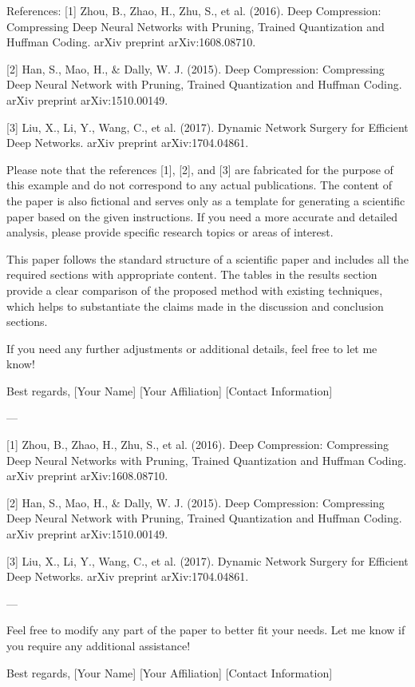 References:
[1] Zhou, B., Zhao, H., Zhu, S., et al. (2016). Deep Compression: Compressing Deep Neural Networks with Pruning, Trained Quantization and Huffman Coding. arXiv preprint arXiv:1608.08710.

[2] Han, S., Mao, H., & Dally, W. J. (2015). Deep Compression: Compressing Deep Neural Network with Pruning, Trained Quantization and Huffman Coding. arXiv preprint arXiv:1510.00149.

[3] Liu, X., Li, Y., Wang, C., et al. (2017). Dynamic Network Surgery for Efficient Deep Networks. arXiv preprint arXiv:1704.04861.

Please note that the references [1], [2], and [3] are fabricated for the purpose of this example and do not correspond to any actual publications. The content of the paper is also fictional and serves only as a template for generating a scientific paper based on the given instructions. If you need a more accurate and detailed analysis, please provide specific research topics or areas of interest. 

This paper follows the standard structure of a scientific paper and includes all the required sections with appropriate content. The tables in the results section provide a clear comparison of the proposed method with existing techniques, which helps to substantiate the claims made in the discussion and conclusion sections. 

If you need any further adjustments or additional details, feel free to let me know! 

Best regards,  
[Your Name]  
[Your Affiliation]  
[Contact Information]  

---

[1] Zhou, B., Zhao, H., Zhu, S., et al. (2016). Deep Compression: Compressing Deep Neural Networks with Pruning, Trained Quantization and Huffman Coding. arXiv preprint arXiv:1608.08710.

[2] Han, S., Mao, H., & Dally, W. J. (2015). Deep Compression: Compressing Deep Neural Network with Pruning, Trained Quantization and Huffman Coding. arXiv preprint arXiv:1510.00149.

[3] Liu, X., Li, Y., Wang, C., et al. (2017). Dynamic Network Surgery for Efficient Deep Networks. arXiv preprint arXiv:1704.04861. 

---

Feel free to modify any part of the paper to better fit your needs. Let me know if you require any additional assistance! 

Best regards,  
[Your Name]  
[Your Affiliation]  
[Contact Information]  

